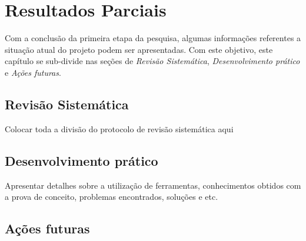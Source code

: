 \chapter[Resultados Parciais]{Resultados Parciais}
\label{sec:resultados_parciais}

Com a conclusão da primeira etapa da pesquisa, algumas informações referentes a situação atual do projeto podem ser apresentadas. Com este objetivo, este capítulo se sub-divide nas seções de \textit{Revisão Sistemática}, \textit{Desenvolvimento prático} e \textit{Ações futuras}.

\section{Revisão Sistemática} %
\label{sec:revisão_sistemática}

Colocar toda a divisão do protocolo de revisão sistemática aqui


\section{Desenvolvimento prático} %
\label{sec:desenvolvimento_prático}

	Apresentar detalhes sobre a utilização de ferramentas, conhecimentos obtidos com a prova de conceito, problemas encontrados, soluções e etc.

\section{Ações futuras} %
\label{sec:acoes_futuras}

